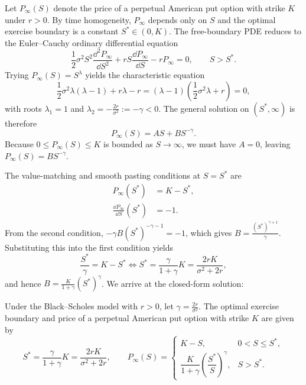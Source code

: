 Let $P_\infty(S)$ denote the price of a perpetual American put option with strike $K$ under $r > 0$. By time homogeneity, $P_\infty$ depends only on $S$ and the optimal exercise boundary is a constant $S^* \in (0, K)$. The free-boundary PDE reduces to the Euler--Cauchy ordinary differential equation
\[
\frac{1}{2}\sigma^2 S^2 \frac{\dd^2 P_\infty}{\dd S^2} + r S \frac{\dd P_\infty}{\dd S} - r P_\infty = 0, \qquad S > S^*.
\]
Trying $P_\infty(S) = S^\lambda$ yields the characteristic equation
\[
\frac{1}{2}\sigma^2 \lambda(\lambda - 1) + r\lambda - r = (\lambda - 1)\left(\frac{1}{2}\sigma^2 \lambda + r\right) = 0,
\]
with roots $\lambda_1 = 1$ and $\lambda_2 = -\frac{2r}{\sigma^2} := -\gamma < 0$. The general solution on $(S^*, \infty)$ is therefore
\[
P_\infty(S) = A S + B S^{-\gamma}.
\]
Because $0 \le P_\infty(S) \le K$ is bounded as $S \to \infty$, we must have $A = 0$, leaving $P_\infty(S) = B S^{-\gamma}$.

The value-matching and smooth pasting conditions at $S = S^*$ are
\[
\begin{aligned}
    P_\infty(S^*) &= K - S^*, \\
    \frac{\dd P_\infty}{\dd S}(S^*) &= -1.
\end{aligned}
\]
From the second condition, $-\gamma B (S^*)^{-\gamma - 1} = -1$, which gives $B = \frac{(S^*)^{\gamma + 1}}{\gamma}$. Substituting this into the first condition yields
\[
\frac{S^*}{\gamma} = K - S^* \iff S^* = \frac{\gamma}{1 + \gamma} K = \frac{2rK}{\sigma^2 + 2r},
\]
and hence $B = \frac{K}{1 + \gamma}(S^*)^\gamma$. We arrive at the closed-form solution:

\begin{theorem}\label{thm:perpetual-put}
    Under the Black--Scholes model with $r > 0$, let $\gamma = \frac{2r}{\sigma^2}$. The optimal exercise boundary and price of a perpetual American put option with strike $K$ are given by
    \[
    S^* = \frac{\gamma}{1 + \gamma} K = \frac{2rK}{\sigma^2 + 2r}, \qquad
    P_\infty(S) = \begin{cases}
        K - S, & 0 < S \le S^*, \\[4pt]
        \dfrac{K}{1 + \gamma}\left(\dfrac{S^*}{S}\right)^{\gamma}, & S > S^*.
    \end{cases}
    \]
\end{theorem}

